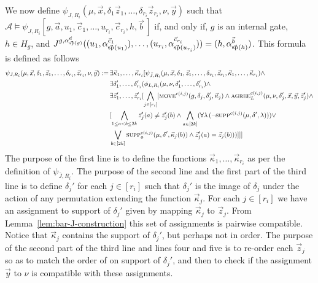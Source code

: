 \documentclass[../main/thesis.tex]{subfiles}
\begin{document}
We now define $\psi_{J, R_i} (\mu, \vec{x}, \delta_{1}\vec{z}_1, \ldots,
\delta_{r_i}\vec{z}_{r_i}, \nu, \vec{y})$ such that $\mathcal{A} \models
\psi_{J, R_i}[g, \vec{a}, u_1, \vec{c}_1, \ldots, u_{r_i}, \vec{c}_{r_i}, h,
\vec{b} \,]$ if, and only if, $g$ is an internal gate, $h \in H_g$, and $J^{g,
  \alpha^{\vec{a}}_{\vec{\text{sp}}(g)}} ((u_1,
\alpha^{\vec{c}_1}_{\vec{\text{sp}}(u_1)}), \ldots, (u_{r_i},
\alpha^{\vec{c}_{r_i}}_{\vec{\text{sp}}(u_{r_i})})) = (h,
\alpha^{\vec{b}}_{\vec{\text{sp}}(h)})$. This formula is defined as follows
\begin{align*}
  \psi_{J, R_i} (\mu, \vec{x}, \delta_{1}, \vec{z}_1, \ldots,  \delta_{r_i}, \vec{z}_{r_i}, \nu, \vec{y}) := \, & \exists \vec{\kappa}_1, \ldots, \vec{\kappa}_{r_i} [\psi_{\bar{J}, R_i} (\mu, \vec{x}, \delta_1, \vec{z}_{1}, \ldots, \delta_{r_i},\vec{z}_{r_i}, \vec{\kappa}_1, \ldots, \vec{\kappa}_{r_i}) \land \\ &\exists \delta_1', \ldots, \delta_{r_i}' (\phi_{L, R_i}(\mu, \nu, \delta_1', \ldots, \delta_{r_i}') \land \\ & \exists \vec{z}_1', \ldots, \vec{z}_{r_i}' [\bigwedge_{j \in [r_i]} [\textsc{move}^{c(i, j)} (g, \delta_j, \delta_j', \vec{\kappa}_j) \land \textsc{agree}^{c(i, j)}_L(\mu, \nu, \delta_j', \vec{x}, \vec{y}, \vec{z}_j')\land\\ &  [\bigwedge_{1 \leq a < b \leq 2k} \vec{z}_j'(a) \neq \vec{z}_j'(b) \land \bigwedge_{a \in [2k]} (\forall \lambda \, (\neg \textsc{supp}^{c(i, j)}(\mu, \delta', \lambda))) \lor \\ & \bigvee_{b \in [2k]} \textsc{supp}^{c(i, j)}_{a} (\mu, \delta', \vec{\kappa}_j(b)) \land \vec{z}_j'(a) = \vec{z}_j (b)))]]]
\end{align*}
The purpose of the first line is to define the functions $\vec{\kappa}_1,
\ldots, \vec{\kappa}_{r_i}$ as per the definition of $\psi_{\bar{J}, R_i}$. The
purpose of the second line and the first part of the third line is to define
$\delta_j'$ for each $j \in [r_i]$ such that $\delta_j'$ is the image of
$\delta_j$ under the action of any permutation extending the function
$\vec{\kappa}_j$. For each $j \in [r_i]$ we have an assignment to support of
$\delta_j'$ given by mapping $\vec{\kappa}_j$ to $\vec{z}_j$. From
Lemma~\ref{lem:bar-J-construction} this set of assignments is pairwise
compatible. Notice that $\vec{\kappa}_j$ contains the support of $\delta_j'$,
but perhaps not in order. The purpose of the second part of the third line and
lines four and five is to re-order each $\vec{z}_j$ so as to match the order of
on support of $\delta_j'$, and then to check if the assignment $\vec{y}$ to
$\nu$ is compatible with these assignments.
\end{document}
